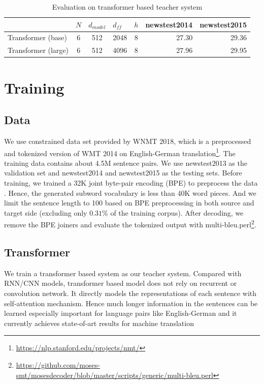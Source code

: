 \documentclass[11pt,a4paper]{article}
\begin{document}
\begin{table}[]
\centering
\begin{tabular}{lccccrr}
\hline
                    & \multicolumn{1}{l}{\(\displaystyle N \)} & \multicolumn{1}{l}{\(\displaystyle d_{model} \)} & \multicolumn{1}{l}{\(\displaystyle d_{ff} \)} & \multicolumn{1}{l}{\(\displaystyle h \)} & \multicolumn{1}{l}{newstest2014} & \multicolumn{1}{l}{newstest2015} \\ \hline
Transformer (base)  & 6                     & 512                        & 2048                  & 8                        & 27.30                            & 29.36                            \\ \hline
Transformer (large) & 6                     & 512                        & 4096                  & 8                        & 27.96                            & 29.95                            \\ \hline
\end{tabular}
\caption{Evaluation on transformer based teacher system}
\label{table:transformer}
\end{table}

\section{Training}

\subsection{Data}
\label{data}

We use constrained data set provided by WNMT 2018, which is a preprocessed and tokenized version of WMT 2014 on English-German translation\footnote{\url{https://nlp.stanford.edu/projects/nmt/}}. The training data contains about 4.5M sentence pairs. We use newstest2013 as the validation set and newstest2014 and newstest2015 as the testing sets. Before training, we trained a 32K joint byte-pair encoding (BPE) to preprocess the data \cite{sennrich2015neural}. Hence, the generated subword vocabulary is less than 40K word pieces. And we limit the sentence length to 100 based on BPE preprocessing in both source and target side (excluding only $0.31\%$ of the training corpus). After decoding, we remove the BPE joiners and evaluate the tokenized output with multi-bleu.perl\footnote{\url{https://github.com/moses-smt/mosesdecoder/blob/master/scripts/generic/multi-bleu.perl}}.

\subsection{Transformer}
\label{transformer}
We train a transformer based system \cite{vaswani2017attention} as our teacher system.
Compared with RNN/CNN models, transformer based model does not rely on recurrent or convolution network.
It directly models the representations of each sentence with self-attention mechanism.
Hence much longer information in the sentences can be learned especially important for language pairs like English-German and it currently achieves state-of-art results for machine translation \cite{DBLP:journals/corr/abs-1803-02155}
\end{document}
